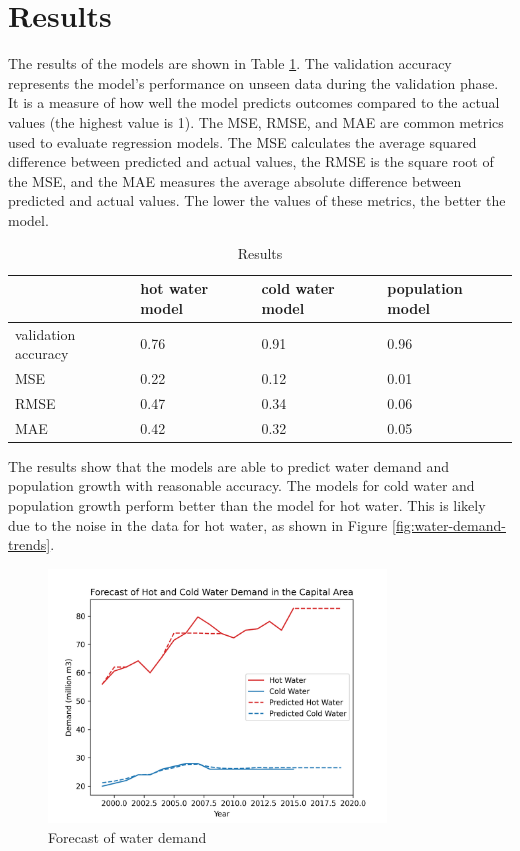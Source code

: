 \documentclass{article}
\begin{document}
\section{Results}
The results of the models are shown in Table \ref{tab:results}. The validation accuracy represents the model's performance on unseen data during the validation phase. It is a measure of how well the model predicts outcomes compared to the actual values (the highest value is 1). The MSE, RMSE, and MAE are common metrics used to evaluate regression models. The MSE calculates the average squared difference between predicted and actual values, the RMSE is the square root of the MSE, and the MAE measures the average absolute difference between predicted and actual values. The lower the values of these metrics, the better the model.

\begin{table}[!ht]
    \centering
    \begin{tabular}{llll}
        \hline
        ~                   & hot water model & cold water model & population model \\ \hline
        validation accuracy & 0.76            & 0.91             & 0.96             \\
        MSE                 & 0.22            & 0.12             & 0.01             \\
        RMSE                & 0.47            & 0.34             & 0.06             \\
        MAE                 & 0.42            & 0.32             & 0.05             \\ \hline
    \end{tabular}
    \caption{Results}
    \label{tab:results}
\end{table}

The results show that the models are able to predict water demand and population growth with reasonable accuracy. The models for cold water and population growth perform better than the model for hot water. This is likely due to the noise in the data for hot water, as shown in Figure \ref{fig:water-demand-trends}.

\begin{figure}[!ht]
    \centering
    \includegraphics[width=0.8\textwidth]{../figures/forecast-of-hot-and-cold-water-demand.png}
    \caption{Forecast of water demand}
    \label{fig:water-demand-predictions}
\end{figure}
\end{document}
